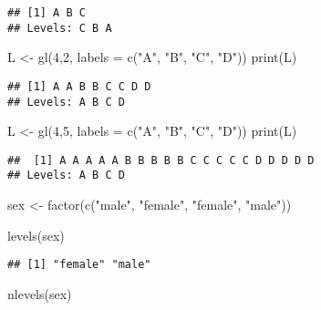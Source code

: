 \documentclass[
]{article}
\newenvironment{Shaded}{\begin{snugshade}}{\end{snugshade}}
\newcommand{\AttributeTok}[1]{\textcolor[rgb]{0.77,0.63,0.00}{#1}}
\newcommand{\DecValTok}[1]{\textcolor[rgb]{0.00,0.00,0.81}{#1}}
\newcommand{\FunctionTok}[1]{\textcolor[rgb]{0.00,0.00,0.00}{#1}}
\newcommand{\NormalTok}[1]{#1}
\newcommand{\OtherTok}[1]{\textcolor[rgb]{0.56,0.35,0.01}{#1}}
\newcommand{\StringTok}[1]{\textcolor[rgb]{0.31,0.60,0.02}{#1}}
\begin{document}
\begin{verbatim}
## [1] A B C
## Levels: C B A
\end{verbatim}

\begin{Shaded}
\begin{Highlighting}[]
\NormalTok{L }\OtherTok{\textless{}{-}} \FunctionTok{gl}\NormalTok{(}\DecValTok{4}\NormalTok{,}\DecValTok{2}\NormalTok{, }\AttributeTok{labels =} \FunctionTok{c}\NormalTok{(}\StringTok{"A"}\NormalTok{, }\StringTok{"B"}\NormalTok{, }\StringTok{"C"}\NormalTok{, }\StringTok{"D"}\NormalTok{))}
\FunctionTok{print}\NormalTok{(L)}
\end{Highlighting}
\end{Shaded}

\begin{verbatim}
## [1] A A B B C C D D
## Levels: A B C D
\end{verbatim}

\begin{Shaded}
\begin{Highlighting}[]
\NormalTok{L }\OtherTok{\textless{}{-}} \FunctionTok{gl}\NormalTok{(}\DecValTok{4}\NormalTok{,}\DecValTok{5}\NormalTok{, }\AttributeTok{labels =} \FunctionTok{c}\NormalTok{(}\StringTok{"A"}\NormalTok{, }\StringTok{"B"}\NormalTok{, }\StringTok{"C"}\NormalTok{, }\StringTok{"D"}\NormalTok{))}
\FunctionTok{print}\NormalTok{(L)}
\end{Highlighting}
\end{Shaded}

\begin{verbatim}
##  [1] A A A A A B B B B B C C C C C D D D D D
## Levels: A B C D
\end{verbatim}

\begin{Shaded}
\begin{Highlighting}[]
\NormalTok{sex }\OtherTok{\textless{}{-}} \FunctionTok{factor}\NormalTok{(}\FunctionTok{c}\NormalTok{(}\StringTok{"male"}\NormalTok{, }\StringTok{"female"}\NormalTok{, }\StringTok{"female"}\NormalTok{, }\StringTok{"male"}\NormalTok{))}

\FunctionTok{levels}\NormalTok{(sex)}
\end{Highlighting}
\end{Shaded}

\begin{verbatim}
## [1] "female" "male"
\end{verbatim}

\begin{Shaded}
\begin{Highlighting}[]
\FunctionTok{nlevels}\NormalTok{(sex)}
\end{Highlighting}
\end{Shaded}
\end{document}
